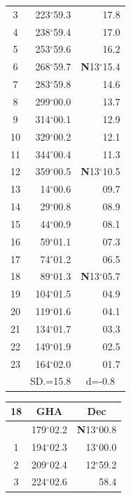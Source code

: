 \documentclass[10pt, a4paper]{report}
\begin{document}
\begin{scriptsize}
\begin{tabular*}{0.2\textwidth}[t]{@{\extracolsep{\fill}}|c|rr|}
3 & 223$^\circ$59.3 & \raisebox{0.24ex}{\boldmath$\cdot$~\boldmath$\cdot$~~}17.8\\
4 & 238$^\circ$59.4 & 17.0\\
5 & 253$^\circ$59.6 & 16.2\\[2Pt]
6 & 268$^\circ$59.7 & \textbf{N}13$^\circ$15.4\\
7 & 283$^\circ$59.8 & 14.6\\
8 & 299$^\circ$00.0 & 13.7\\
9 & 314$^\circ$00.1 & \raisebox{0.24ex}{\boldmath$\cdot$~\boldmath$\cdot$~~}12.9\\
10 & 329$^\circ$00.2 & 12.1\\
11 & 344$^\circ$00.4 & 11.3\\[2Pt]
12 & 359$^\circ$00.5 & \textbf{N}13$^\circ$10.5\\
13 & 14$^\circ$00.6 & 09.7\\
14 & 29$^\circ$00.8 & 08.9\\
15 & 44$^\circ$00.9 & \raisebox{0.24ex}{\boldmath$\cdot$~\boldmath$\cdot$~~}08.1\\
16 & 59$^\circ$01.1 & 07.3\\
17 & 74$^\circ$01.2 & 06.5\\[2Pt]
18 & 89$^\circ$01.3 & \textbf{N}13$^\circ$05.7\\
19 & 104$^\circ$01.5 & 04.9\\
20 & 119$^\circ$01.6 & 04.1\\
21 & 134$^\circ$01.7 & \raisebox{0.24ex}{\boldmath$\cdot$~\boldmath$\cdot$~~}03.3\\
22 & 149$^\circ$01.9 & 02.5\\
23 & 164$^\circ$02.0 & 01.7\\
\hline
\rule{0pt}{2.4ex} & \multicolumn{1}{c}{SD.=15.8} & \multicolumn{1}{c|}{d=-0.8}\\
\hline
\end{tabular*}\noindent
\begin{tabular*}{0.2\textwidth}[t]{@{\extracolsep{\fill}}|c|rr|}
\hline
\multicolumn{1}{|c|}{\rule{0pt}{2.6ex}\textbf{18}} & \multicolumn{1}{c}{\textbf{GHA}} & \multicolumn{1}{c|}{\textbf{Dec}}\\
\hline\rule{0pt}{2.6ex}\noindent
0 & 179$^\circ$02.2 & \textbf{N}13$^\circ$00.8\\
1 & 194$^\circ$02.3 & 13$^\circ$00.0\\
2 & 209$^\circ$02.4 & 12$^\circ$59.2\\
3 & 224$^\circ$02.6 & \raisebox{0.24ex}{\boldmath$\cdot$~\boldmath$\cdot$~~}58.4\\

\end{tabular*}
\end{scriptsize}
\end{document}
